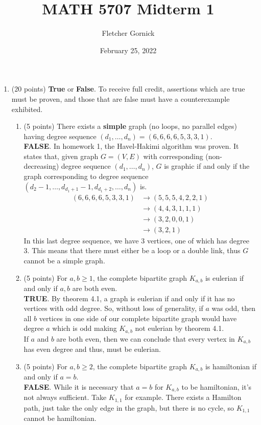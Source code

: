 \documentclass[11pt]{article}
\title{\vspace{-1.0cm}MATH 5707 Midterm 1}
\author{Fletcher Gornick}
\date{February 25, 2022}
\newcommand{\n}{\vspace{0.5cm}}
\begin{document}
\maketitle
  \begin{enumerate}
    \item (20 points) \textbf{True} or \textbf{False}.  To receive full credit, assertions which are true must be proven, and those that are false must have a counterexample exhibited.
      \begin{enumerate}
        \item (5 points) There exists a \textbf{simple} graph (no loops, no parallel edges) having degree sequence \((d_1, \hdots, d_n) = (6,6,6,6,5,3,3,1)\). \n\\
          \textbf{FALSE}.  In homework 1, the Havel-Hakimi algorithm was proven.  It states that, given graph \(G = (V,E)\) with corresponding (non-decreasing) degree sequence \((d_1, \hdots, d_n)\), \(G\) is graphic if and only if the graph corresponding to degree sequence \((d_2-1, \hdots, d_{d_1+1}-1, d_{d_1+2}, \hdots, d_n)\) is.
          \begin{align*}
            (6,6,6,6,5,3,3,1) &\to (5,5,5,4,2,2,1) \\
                              &\to (4,4,3,1,1,1) \\
                              &\to (3,2,0,0,1) \\
                              &\to (3,2,1)
          \end{align*}
          In this last degree sequence, we have 3 vertices, one of which has degree 3.  This means that there must either be a loop or a double link, thus \(G\) cannot be a simple graph. \n

        \item (5 points) For \(a,b \geq 1\), the complete bipartite graph \(K_{a,b}\) is eulerian if and only if \(a,b\) are both even. \n\\
          \textbf{TRUE}.  By theorem 4.1, a graph is eulerian if and only if it has no vertices with odd degree.  So, without loss of generality,  if \(a\) was odd, then all \(b\) vertices in one side of our complete bipartite graph would have degree \(a\) which is odd making \(K_{a,b}\) not eulerian by theorem 4.1. \n\\
          If \(a\) and \(b\) are both even, then we can conclude that every vertex in \(K_{a,b}\) has even degree and thus, must be eulerian. \n

        \item (5 points) For \(a,b \geq 2\), the complete bipartite graph \(K_{a,b}\) is hamiltonian if and only if \(a = b\). \n\\
          \textbf{FALSE}.  While it is necessary that \(a = b\) for \(K_{a,b}\) to be hamiltonian, it's not always sufficient.  Take \(K_{1,1}\) for example.  There exists a Hamilton path, just take the only edge in the graph, but there is no cycle, so \(K_{1,1}\) cannot be hamiltonian. \n


\end{enumerate}
\end{enumerate}
\end{document}
